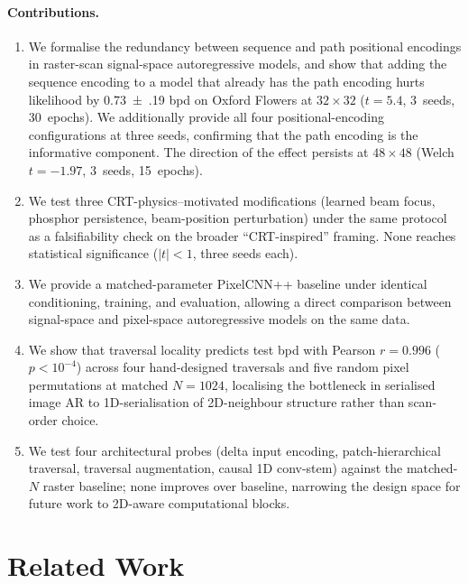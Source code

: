 \documentclass[conference,a4paper]{IEEEtran}
\begin{document}
\paragraph{Contributions.}
\begin{enumerate}
  \item We formalise the redundancy between sequence and path
    positional encodings in raster-scan signal-space autoregressive
    models, and show that adding the sequence encoding to a model
    that already has the path encoding hurts likelihood by
    \SI{0.73(19)}{} bpd
    on Oxford Flowers at $32\times32$ ($t=5.4$, 3~seeds, 30~epochs).
    We additionally provide all four positional-encoding
    configurations at three seeds, confirming that the path encoding
    is the informative component. The direction of the effect
    persists at $48\times48$ (Welch $t=-1.97$, 3~seeds, 15~epochs).
  \item We test three CRT-physics--motivated modifications
    (learned beam focus, phosphor persistence, beam-position
    perturbation) under the same protocol as a falsifiability check
    on the broader ``CRT-inspired'' framing. None reaches statistical
    significance ($|t|<1$, three seeds each).
  \item We provide a matched-parameter PixelCNN++ baseline under
    identical conditioning, training, and evaluation, allowing a
    direct comparison between signal-space and pixel-space
    autoregressive models on the same data.
  \item We show that traversal locality predicts test bpd with
    Pearson $r=0.996$ ($p<10^{-4}$) across four hand-designed
    traversals and five random pixel permutations at matched
    $N{=}1024$, localising the bottleneck in serialised image AR
    to 1D-serialisation of 2D-neighbour structure rather than
    scan-order choice.
  \item We test four architectural probes (delta input encoding,
    patch-hierarchical traversal, traversal augmentation, causal
    1D conv-stem) against the matched-$N$ raster baseline; none
    improves over baseline, narrowing the design space for future
    work to 2D-aware computational blocks.
\end{enumerate}

\section{Related Work}\label{sec:related}
\end{document}

